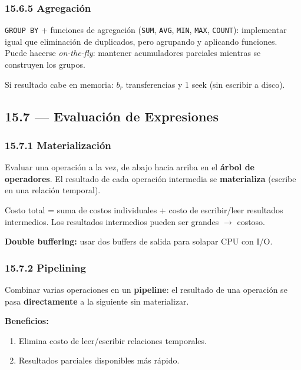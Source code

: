 \documentclass[11pt, a4paper]{article}
\begin{document}
\subsubsection{15.6.5 Agregación}

\texttt{GROUP BY} + funciones de agregación (\texttt{SUM}, \texttt{AVG}, \texttt{MIN}, \texttt{MAX}, \texttt{COUNT}): implementar igual que eliminación de duplicados, pero agrupando y aplicando funciones. Puede hacerse \textit{on-the-fly}: mantener acumuladores parciales mientras se construyen los grupos.

Si resultado cabe en memoria: $b_r$ transferencias y 1 seek (sin escribir a disco).

\subsection{15.7 --- Evaluación de Expresiones}

\subsubsection{15.7.1 Materialización}

Evaluar una operación a la vez, de abajo hacia arriba en el \textbf{árbol de operadores}. El resultado de cada operación intermedia se \textbf{materializa} (escribe en una relación temporal).

Costo total = suma de costos individuales + costo de escribir/leer resultados intermedios. Los resultados intermedios pueden ser grandes $\rightarrow$ costoso.

\textbf{Double buffering:} usar dos buffers de salida para solapar CPU con I/O.

\subsubsection{15.7.2 Pipelining}

Combinar varias operaciones en un \textbf{pipeline}: el resultado de una operación se pasa \textbf{directamente} a la siguiente sin materializar.

\textbf{Beneficios:}
\begin{enumerate}[nosep]
	\item Elimina costo de leer/escribir relaciones temporales.
	\item Resultados parciales disponibles más rápido.
\end{enumerate}
\end{document}
